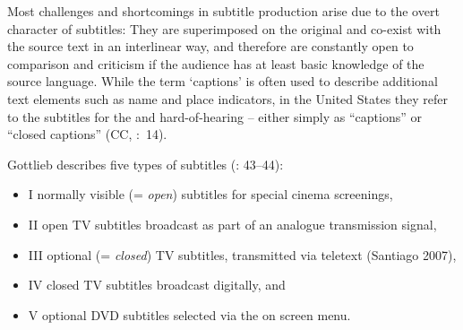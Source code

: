 Most challenges and shortcomings in subtitle production arise due to the overt character of subtitles: They are superimposed on the original and co-exist with the source text in an interlinear way, and therefore are constantly open to comparison and criticism if the audience has at least basic knowledge of the source language. While the term ‘captions’ is often used to describe additional text elements such as name and place indicators, in the United States they refer to the subtitles for the  and hard-of-hearing – either simply as “captions” or “closed captions” (CC, \citealt{Diaz_cintas2007}:~14).

Gottlieb describes five types of subtitles (\citeyear{Gottlieb2012}: 43--44):
\begin{itemize}
\item I   normally visible (= \textit{open}) subtitles for special cinema screenings,
\item II   open TV subtitles broadcast as part of an analogue transmission signal,
\item III   optional (= \textit{closed}) TV subtitles, transmitted via teletext (Santiago 2007),
\item IV   closed TV subtitles broadcast digitally, and
\item V   optional DVD subtitles selected via the on screen menu.
\end{itemize}

